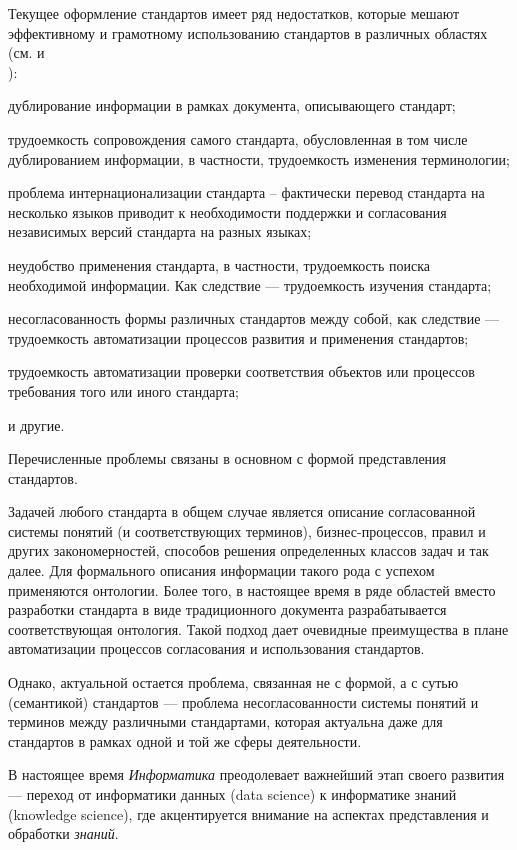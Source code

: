 Текущее оформление стандартов имеет ряд недостатков, которые мешают эффективному и грамотному использованию стандартов в различных областях (см.  и \\ ):
\begin{textitemize}
	\item дублирование информации в рамках документа, описывающего стандарт;
	\item трудоемкость сопровождения самого стандарта, обусловленная в том числе дублированием информации, в частности, трудоемкость изменения терминологии;
	\item проблема интернационализации стандарта -- фактически перевод стандарта на несколько языков приводит к необходимости поддержки и согласования независимых версий стандарта на разных языках;
	\item неудобство применения стандарта, в частности, трудоемкость поиска необходимой информации. Как следствие --- трудоемкость изучения стандарта;
	\item несогласованность формы различных стандартов между собой, как следствие --- трудоемкость автоматизации процессов развития и применения стандартов;
	\item трудоемкость автоматизации проверки соответствия объектов или процессов требования того или иного стандарта;
	\item  и другие.
\end{textitemize}

Перечисленные проблемы связаны в основном с формой представления стандартов. 

Задачей любого стандарта в общем случае является описание согласованной системы понятий (и соответствующих терминов), бизнес-процессов, правил и других закономерностей, способов решения определенных классов задач и так далее. Для формального описания информации такого рода с успехом применяются онтологии. Более того, в настоящее время в ряде областей вместо разработки стандарта в виде традиционного документа разрабатывается соответствующая онтология. Такой подход дает очевидные преимущества в плане автоматизации процессов согласования и использования стандартов.

Однако, актуальной остается проблема, связанная не с формой, а с сутью (семантикой) стандартов --- проблема несогласованности системы понятий и терминов между различными стандартами, которая актуальна даже для стандартов в рамках одной и той же сферы деятельности.

В настоящее время \textit{Информатика} преодолевает важнейший этап своего развития --- переход от информатики данных (data science) к информатике знаний (knowledge science), где акцентируется внимание на  аспектах представления и обработки \textit{знаний}.

